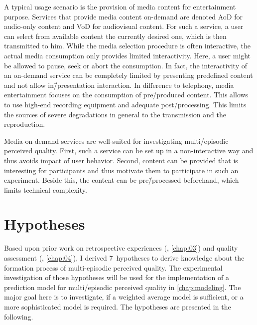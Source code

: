 A typical usage scenario is the provision of media content for entertainment purpose.
Services that provide media content on-demand are denoted \acf{AoD} for audio-only content and \acf{VoD} for audiovisual content.
For such a service, a user can select from available content the currently desired one, which is then transmitted to him.
While the media selection procedure is often interactive, the actual media consumption only provides limited interactivity.
Here, a user might be allowed to pause, seek or abort the consumption.
In fact, the interactivity of an on-demand service can be completely limited by presenting predefined content and not allow in\=/presentation interaction.
In difference to telephony, media entertainment focuses on the consumption of pre\=/produced content.
This allows to use high-end recording equipment and adequate post\=/processing. %
This limits the sources of severe degradations in general to the transmission and the reproduction.

Media-on-demand services are well-suited for investigating multi\-/episodic perceived quality.
First, such a service can be set up in a non-interactive way and thus avoids impact of user behavior.
Second, content can be provided that is interesting for participants and thus motivate them to participate in such an experiment.
Beside this, the content can be pre\=/processed beforehand, which limits technical complexity.

\section{Hypotheses}
Based upon prior work on retrospective experiences (\cf, \autoref{chap:03}) and quality assessment (\cf, \autoref{chap:04}), I derived 7~hypotheses to derive knowledge about the formation process of multi-episodic perceived quality.
The experimental investigation of those hypotheses will be used for the implementation of a prediction model for multi\-/episodic perceived quality in \autoref{chap:modeling}.
The major goal here is to investigate, if a weighted average model is sufficient, or a more sophisticated model is required.
The hypotheses are presented in the following.


